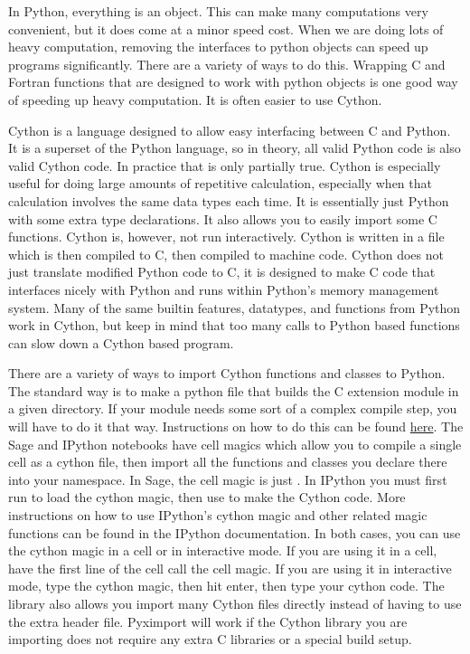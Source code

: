 

In Python, everything is an object.
This can make many computations very convenient, but it does come at a minor speed cost.
When we are doing lots of heavy computation, removing the interfaces to python objects can speed up programs significantly.
There are a variety of ways to do this.
Wrapping C and Fortran functions that are designed to work with python objects is one good way of speeding up heavy computation.
It is often easier to use Cython.

Cython is a language designed to allow easy interfacing between C and Python.
It is a superset of the Python language, so in theory, all valid Python code is also valid Cython code.
In practice that is only partially true.
Cython is especially useful for doing large amounts of repetitive calculation, especially when that calculation involves the same data types each time.
It is essentially just Python with some extra type declarations.
It also allows you to easily import some C functions.
Cython is, however, not run interactively.
Cython is written in a  file which is then compiled to C, then compiled to machine code.
Cython does not just translate modified Python code to C, it is designed to make C code that interfaces nicely with Python and runs within Python's memory management system.
Many of the same builtin features, datatypes, and functions from Python work in Cython, but keep in mind that too many calls to Python based functions can slow down a Cython based program.

There are a variety of ways to import Cython functions and classes to Python.
The standard way is to make a python file that builds the C extension module in a given directory.
If your module needs some sort of a complex compile step, you will have to do it that way.
Instructions on how to do this can be found \href{http://docs.cython.org/src/reference/compilation.html}{here}.
The Sage and IPython notebooks have cell magics which allow you to compile a single cell as a cython file, then import all the functions and classes you declare there into your namespace.
In Sage, the cell magic is just .
In IPython you must first run  to load the cython magic, then use  to make the Cython code.
More instructions on how to use IPython's cython magic and other related magic functions can be found in the IPython documentation.
In both cases, you can use the cython magic in a cell or in interactive mode.
If you are using it in a cell, have the first line of the cell call the cell magic.
If you are using it in interactive mode, type the cython magic, then hit enter, then type your cython code.
The library  also allows you import many Cython files directly instead of having to use the extra header file.
Pyximport will work if the Cython library you are importing does not require any extra C libraries or a special build setup.

